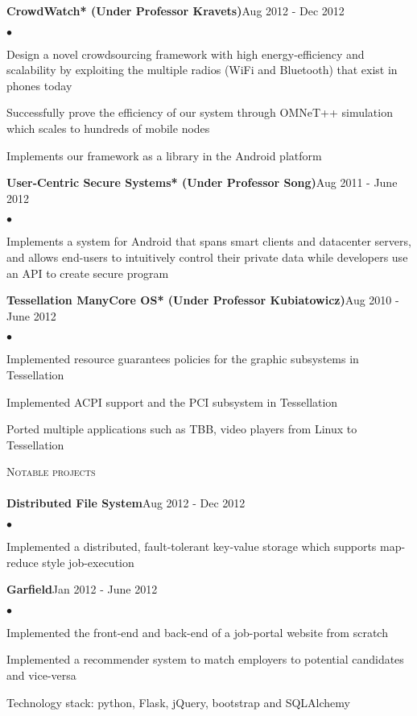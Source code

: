 \documentclass{article}
\newcommand{\lineunder}{\vspace*{-8pt} \\ \hspace*{-18pt} \hrulefill \\}
\newcommand{\header}[1]{{\hspace*{-15pt}\vspace*{6pt} \textsc{#1}} \vspace*{-6pt} \lineunder}
\newcommand{\project}[2]{{ \textbf{#1}\hfill{#2}\\ }}
\newenvironment{achievements}{\begin{list}{$\bullet$}{\topsep 0pt \itemsep -2pt}}{\vspace*{4pt}\end{list}}
\begin{document}
\project{CrowdWatch* (Under Professor Kravets)}{Aug 2012 - Dec 2012}
    \begin{achievements}
    \item Design a novel crowdsourcing framework with high energy-efficiency and scalability by exploiting the multiple radios (WiFi and Bluetooth) that exist in phones today
    \item Successfully prove the efficiency of our system through OMNeT++ simulation which scales to hundreds of mobile nodes
    \item Implements our framework as a library in the Android platform
		\end{achievements}

\project{User-Centric Secure Systems* (Under Professor Song)}{Aug 2011 - June 2012}
    \begin{achievements}
    \item Implements a system for Android that spans smart clients and datacenter servers, and allows end-users to intuitively control their private data while developers use an API to create secure program
		\end{achievements}

\project{Tessellation ManyCore OS* (Under Professor Kubiatowicz)}{Aug 2010 - June 2012}
    \begin{achievements}
    \item Implemented resource guarantees policies for the graphic subsystems in Tessellation
    \item Implemented ACPI support and the PCI subsystem in Tessellation
    \item Ported multiple applications such as TBB, video players from Linux to Tessellation
		\end{achievements}

\header{Notable projects}
\project{Distributed File System}{Aug 2012 - Dec 2012}
    \begin{achievements}
    \item Implemented a distributed, fault-tolerant key-value storage which supports map-reduce style job-execution
		\end{achievements}

\project{Garfield}{Jan 2012 - June 2012}
    \begin{achievements}
    \item Implemented the front-end and back-end of a job-portal website from scratch
    \item Implemented a recommender system to match employers to potential candidates and vice-versa
    \item Technology stack: python, Flask, jQuery, bootstrap and SQLAlchemy
    \end{achievements}
\end{document}
